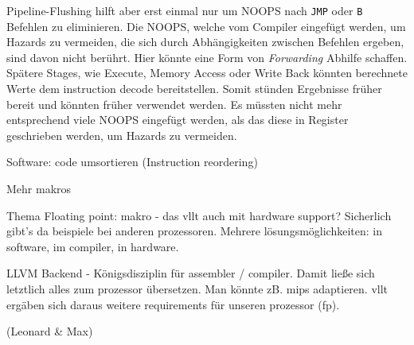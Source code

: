 \documentclass[paper=a4,fontsize=12pt,twocolumn]{scrreprt}
\begin{document}
Pipeline-Flushing hilft aber erst einmal nur um NOOPS nach \texttt{JMP} oder \texttt{B} Befehlen zu eliminieren.
Die NOOPS, welche vom Compiler eingefügt werden, um Hazards zu vermeiden, die sich durch Abhängigkeiten zwischen Befehlen ergeben, sind davon nicht berührt.
Hier könnte eine Form von \textit{Forwarding} Abhilfe schaffen.
Spätere Stages, wie Execute, Memory Access oder Write Back könnten berechnete Werte dem instruction decode bereitstellen.
Somit stünden Ergebnisse früher bereit und könnten früher verwendet werden.
Es müssten nicht mehr entsprechend viele NOOPS eingefügt werden, als das diese in Register geschrieben werden, um Hazards zu vermeiden.

Software: code umsortieren (Instruction reordering)

Mehr makros

Thema Floating point: makro - das vllt auch mit hardware support?
Sicherlich gibt's da beispiele bei anderen prozessoren. Mehrere lösungsmöglichkeiten: in software, im compiler, in hardware.

LLVM Backend - Königsdisziplin für assembler / compiler.
Damit ließe sich letztlich alles zum prozessor übersetzen.
Man könnte zB. mips adaptieren.
vllt ergäben sich daraus weitere requirements für unseren prozessor (fp).

(Leonard \& Max)
\end{document}
